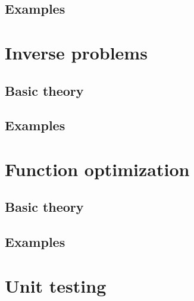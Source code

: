 \documentclass[pdftex, a4paper, 10pt]{book}
\begin{document}
\section{Examples}\label{ExamplesOptimalShapeDesign}


 
\chapter{Inverse problems}\label{InverseProblems}


\section{Basic theory}\label{BasicTheoryInverseProblems}


\section{Examples}\label{ExamplesInverseProblems}


 
\chapter{Function optimization}\label{FunctionOptimization}


\section{Basic theory}\label{BasicTheoryFunctionOptimization}

 
\section{Examples}\label{FunctionOptimizationExamples}

 

\appendix

\chapter{Unit testing}\label{UnitTesting}




\end{document}
